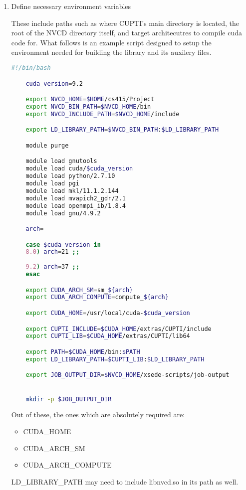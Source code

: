 \documentclass[8pt, a4paper, twoside, twoclumn, english]{extreport}
\begin{document}
\begin{enumerate}
\item Define necessary environment variables
  
  \begin{center}
    These include paths such as where CUPTI's main directory is located,
    the root of the NVCD directory itself, and target architecutres to compile cuda code for.
    What follows is an example script designed to setup the environment needed for building the
    library and its auxilery files.
  \end{center}

  \begin{lstlisting}[language=bash, caption=XSEDE compute cluster build environment setup]
    #!/bin/bash

    cuda_version=9.2

    export NVCD_HOME=$HOME/cs415/Project
    export NVCD_BIN_PATH=$NVCD_HOME/bin
    export NVCD_INCLUDE_PATH=$NVCD_HOME/include

    export LD_LIBRARY_PATH=$NVCD_BIN_PATH:$LD_LIBRARY_PATH

    module purge

    module load gnutools
    module load cuda/$cuda_version
    module load python/2.7.10
    module load pgi
    module load mkl/11.1.2.144
    module load mvapich2_gdr/2.1
    module load openmpi_ib/1.8.4
    module load gnu/4.9.2

    arch=

    case $cuda_version in
    8.0) arch=21 ;;
    
    9.2) arch=37 ;;
    esac

    export CUDA_ARCH_SM=sm_${arch}
    export CUDA_ARCH_COMPUTE=compute_${arch}

    export CUDA_HOME=/usr/local/cuda-$cuda_version

    export CUPTI_INCLUDE=$CUDA_HOME/extras/CUPTI/include
    export CUPTI_LIB=$CUDA_HOME/extras/CUPTI/lib64

    export PATH=$CUDA_HOME/bin:$PATH
    export LD_LIBRARY_PATH=$CUPTI_LIB:$LD_LIBRARY_PATH

    export JOB_OUTPUT_DIR=$NVCD_HOME/xsede-scripts/job-output


    mkdir -p $JOB_OUTPUT_DIR
  \end{lstlisting}

  \begin{center}
    Out of these, the ones which are absolutely required are:
  \end{center}
  \begin {itemize}
  \item CUDA\_HOME
  \item CUDA\_ARCH\_SM
  \item CUDA\_ARCH\_COMPUTE
  \end {itemize}

  \begin{center}
    LD\_LIBRARY\_PATH may need to include libnvcd.so in its path as well.
  \end{center}
  
\end{enumerate}
\end{document}
